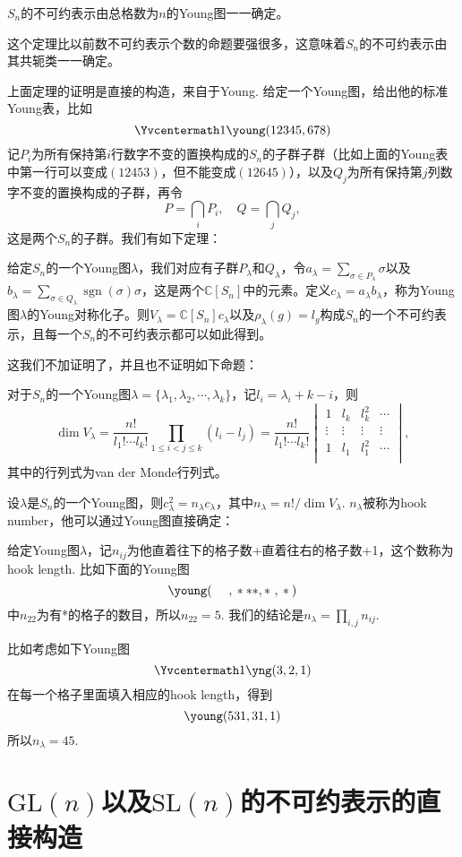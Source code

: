 \documentclass[9pt]{extarticle}
\newcommand{\cc}{\mathbb{C}}
\DeclareMathOperator{\sgn}{sgn}
\begin{document}
\theo $S_n$的不可约表示由总格数为$n$的Young图一一确定。

这个定理比以前数不可约表示个数的命题要强很多，这意味着$S_n$的不可约表示由其共轭类一一确定。

\para 上面定理的证明是直接的构造，来自于Young. 给定一个Young图，给出他的标准Young表，比如
\[\Yvcentermath1
	\young(12345,678)
\]
记$P_i$为所有保持第$i$行数字不变的置换构成的$S_n$的子群子群（比如上面的Young表中第一行可以变成$(12453)$，但不能变成$(12645)$），以及$Q_j$为所有保持第$j$列数字不变的置换构成的子群，再令
\[
	P=\bigcap_i P_i,\quad Q=\bigcap_j Q_j,
\]
这是两个$S_n$的子群。我们有如下定理：

\theo 给定$S_n$的一个Young图$\lambda$，我们对应有子群$P_\lambda$和$Q_\lambda$，令$a_\lambda=\sum_{\sigma\in P_\lambda}\sigma$以及$b_\lambda=\sum_{\sigma\in Q_\lambda}\sgn(\sigma)\sigma$，这是两个$\cc[S_n]$中的元素。定义$c_\lambda=a_\lambda b_\lambda$，称为Young图$\lambda$的Young对称化子。则$V_\lambda=\cc[S_n]c_\lambda$以及$\rho_\lambda(g)=l_g$构成$S_n$的一个不可约表示，且每一个$S_n$的不可约表示都可以如此得到。

这我们不加证明了，并且也不证明如下命题：

\pro 对于$S_n$的一个Young图$\lambda=\{\lambda_1,\lambda_2,\cdots,\lambda_k\}$，记$l_i=\lambda_i+k-i$，则
\[
	\dim V_\lambda=\frac{n!}{l_1!\cdots l_k!}\prod_{1\leq i< j\leq k}(l_i-l_j)=\frac{n!}{l_1!\cdots l_k!}\begin{vmatrix}
	1& l_k & l_k^2&\cdots\\
	\vdots&\vdots&\vdots&\vdots\\
	1& l_1 & l_1^2&\cdots\\
	\end{vmatrix},
\]
其中的行列式为van der Monde行列式。

\pro 设$\lambda$是$S_n$的一个Young图，则$c_\lambda^2=n_\lambda c_\lambda$，其中$n_\lambda=n!/\dim V_\lambda$. $n_\lambda$被称为hook number，他可以通过Young图直接确定：

给定Young图$\lambda$，记$n_{ij}$为他直着往下的格子数+直着往右的格子数+1，这个数称为hook length. 比如下面的Young图
\[
	\young(~~~~,{}***,{}*~,{}*{})
\]
中$n_{22}$为有*的格子的数目，所以$n_{22}=5$. 我们的结论是$n_\lambda=\prod_{i,j}n_{ij}$.

比如考虑如下Young图\[\Yvcentermath1
	\yng(3,2,1)
\]
在每一个格子里面填入相应的hook length，得到
\[
	\young(531,31,1)
\]
所以$n_\lambda= 45$.

\section{$\mathrm{GL}(n)$以及$\mathrm{SL}(n)$的不可约表示的直接构造}
\end{document}
